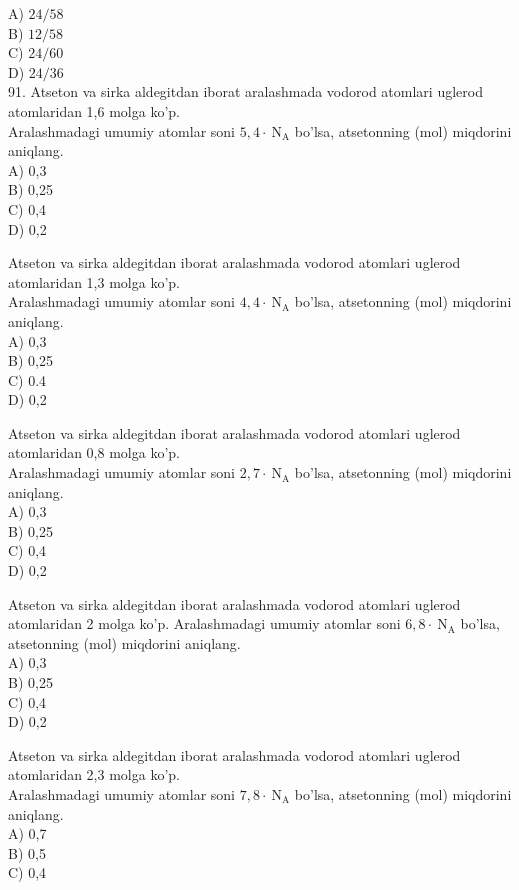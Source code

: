 A) $24 / 58$\\
B) $12 / 58$\\
C) $24 / 60$\\
D) $24 / 36$\\
91. Atseton va sirka aldegitdan iborat aralashmada vodorod atomlari uglerod atomlaridan 1,6 molga ko'p.\\
Aralashmadagi umumiy atomlar soni $5,4 \cdot \mathrm{~N}_{\mathrm{A}}$ bo'lsa, atsetonning (mol) miqdorini aniqlang.\\
A) 0,3\\
B) 0,25\\
C) 0,4\\
D) 0,2
  \item Atseton va sirka aldegitdan iborat aralashmada vodorod atomlari uglerod atomlaridan 1,3 molga ko'p.\\Aralashmadagi umumiy atomlar soni $4,4 \cdot \mathrm{~N}_{\mathrm{A}}$ bo'lsa, atsetonning (mol) miqdorini aniqlang.\\
A) 0,3\\
B) 0,25\\
C) 0.4\\
D) 0,2
  \item Atseton va sirka aldegitdan iborat aralashmada vodorod atomlari uglerod atomlaridan 0,8 molga ko'p.\\
Aralashmadagi umumiy atomlar soni $2,7 \cdot \mathrm{~N}_{\mathrm{A}}$ bo'lsa, atsetonning (mol) miqdorini aniqlang.\\
A) 0,3\\
B) 0,25\\
C) 0,4\\
D) 0,2
  \item Atseton va sirka aldegitdan iborat aralashmada vodorod atomlari uglerod atomlaridan 2 molga ko'p. Aralashmadagi umumiy atomlar soni $6,8 \cdot \mathrm{~N}_{\mathrm{A}}$ bo'lsa, atsetonning (mol) miqdorini aniqlang.\\
A) 0,3\\
B) 0,25\\
C) 0,4\\
D) 0,2
  \item Atseton va sirka aldegitdan iborat aralashmada vodorod atomlari uglerod atomlaridan 2,3 molga ko'p.\\
Aralashmadagi umumiy atomlar soni $7,8 \cdot \mathrm{~N}_{\mathrm{A}}$ bo'lsa, atsetonning (mol) miqdorini aniqlang.\\
A) 0,7\\
B) 0,5\\
C) 0,4\\
